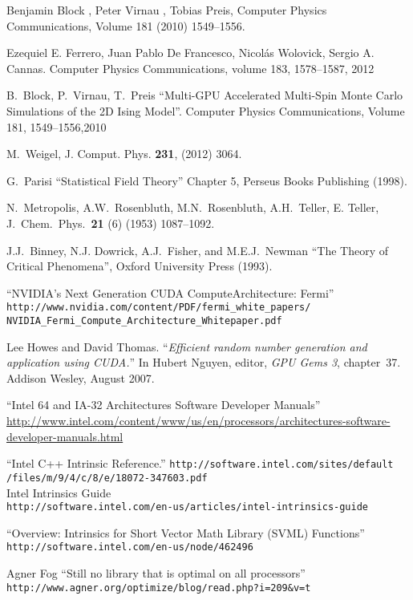 \documentclass[a4paper]{llncs}
\begin{document}
\begin{thebibliography}{9}


Benjamin Block , Peter Virnau , Tobias Preis, Computer Physics
Communications, Volume 181 (2010) 1549–1556.

Ezequiel E. Ferrero, Juan Pablo De Francesco, Nicolás Wolovick,
Sergio A. Cannas. Computer Physics Communications, volume 183, 1578--1587, 2012

B.~Block, P.~Virnau, T.~Preis ``Multi-GPU Accelerated
Multi-Spin Monte Carlo Simulations of the 2D Ising Model''. Computer Physics
Communications, Volume 181, 1549--1556,2010

 M.~Weigel, J. Comput. Phys. \textbf{231},  (2012) 3064.

 G.~Parisi ``Statistical Field Theory'' Chapter 5, Perseus
Books Publishing (1998).

 N.~Metropolis, A.W.~Rosenbluth, M.N.~Rosenbluth,
A.H.~Teller, E. Teller, J.~Chem.~Phys.~\textbf{21} (6) (1953) 1087--1092.

 J.J.~Binney, N.J. Dowrick, A.J.~Fisher, and M.E.J.~Newman
``The Theory of Critical Phenomena'', Oxford University Press (1993).

 ``NVIDIA's Next Generation CUDA ComputeArchitecture: Fermi'' \\
\verb!http://www.nvidia.com/content/PDF/fermi_white_papers/!\\
\verb!NVIDIA_Fermi_Compute_Architecture_Whitepaper.pdf!

 Lee Howes and David Thomas. ``{\em Efficient random
number generation and application using {CUDA}.}'' In Hubert Nguyen, editor,
{\em GPU Gems 3}, chapter~37. Addison Wesley, August 2007.

 ``Intel 64 and IA-32 Architectures Software Developer Manuals''
\\
\url{http://www.intel.com/content/www/us/en/processors/architectures-software-developer-manuals.html}

 ``Intel C++ Intrinsic Reference.''
\verb!http://software.intel.com/sites/default!\\
\verb!/files/m/9/4/c/8/e/18072-347603.pdf! \\
Intel Intrinsics Guide\\
\verb!http://software.intel.com/en-us/articles/intel-intrinsics-guide!

 ``Overview: Intrinsics for Short Vector Math Library (SVML)
Functions'' \verb!http://software.intel.com/en-us/node/462496!

 Agner Fog ``Still no library that is optimal on all processors''
\verb!http://www.agner.org/optimize/blog/read.php?i=209&v=t!

\end{thebibliography}
\end{document}
